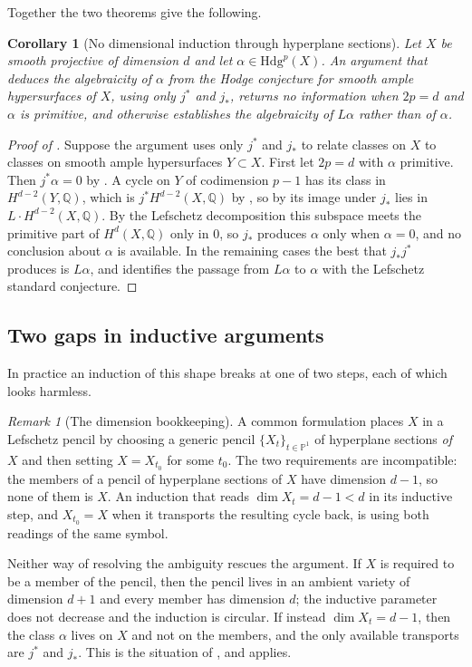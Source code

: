 \documentclass[11pt,reqno]{amsart}
\theoremstyle{plain}
\newtheorem{corollary}[theorem]{Corollary}
\theoremstyle{definition}
\theoremstyle{remark}
\newtheorem{remark}[theorem]{Remark}
\newcommand{\QQ}{\mathbb{Q}}
\newcommand{\PP}{\mathbb{P}}
\newcommand{\Hdg}{\mathrm{Hdg}}
\begin{document}
Together the two theorems give the following.

\begin{corollary}[No dimensional induction through hyperplane sections]%
\label{cor:noinduction}
Let $X$ be smooth projective of dimension $d$ and let $\alpha\in\Hdg^{p}(X)$.
An argument that deduces the algebraicity of $\alpha$ from the Hodge
conjecture for smooth ample hypersurfaces of $X$, using only $j^{*}$ and
$j_{*}$, returns no information when $2p=d$ and $\alpha$ is primitive, and
otherwise establishes the algebraicity of $L\alpha$ rather than of $\alpha$.
\end{corollary}

\begin{proof}[Proof of ]
Suppose the argument uses only $j^{*}$ and $j_{*}$ to relate classes on $X$ to
classes on smooth ample hypersurfaces $Y\subset X$. First let $2p=d$ with
$\alpha$ primitive. Then $j^{*}\alpha=0$ by . A cycle on
$Y$ of codimension $p-1$ has its class in $H^{d-2}(Y,\QQ)$, which is
$j^{*}H^{d-2}(X,\QQ)$ by , so by  its
image under $j_{*}$ lies in $L\cdot H^{d-2}(X,\QQ)$. By the Lefschetz
decomposition this subspace meets the primitive part of $H^{d}(X,\QQ)$ only
in $0$, so $j_{*}$ produces $\alpha$ only when $\alpha=0$, and no conclusion
about $\alpha$ is available. In the remaining cases the best that
$j_{*}j^{*}$ produces is $L\alpha$, and  identifies the
passage from $L\alpha$ to $\alpha$ with the Lefschetz standard conjecture.
\end{proof}

\subsection{Two gaps in inductive arguments}

In practice an induction of this shape breaks at one of two steps, each of
which looks harmless.

\begin{remark}[The dimension bookkeeping]\label{rem:dimensionbookkeeping}
A common formulation places $X$ in a Lefschetz pencil by choosing a generic
pencil $\{X_{t}\}_{t\in\PP^{1}}$ of hyperplane sections \emph{of $X$} and then
setting $X=X_{t_{0}}$ for some $t_{0}$. The two requirements are
incompatible: the members of a pencil of hyperplane sections of $X$ have
dimension $d-1$, so none of them is $X$. An induction that reads
$\dim X_{t}=d-1<d$ in its inductive step, and $X_{t_{0}}=X$ when it transports
the resulting cycle back, is using both readings of the same symbol.

Neither way of resolving the ambiguity rescues the argument. If $X$ is
required to be a member of the pencil, then the pencil lives in an ambient
variety of dimension $d+1$ and every member has dimension $d$; the inductive
parameter does not decrease and the induction is circular. If instead
$\dim X_{t}=d-1$, then the class $\alpha$ lives on $X$ and not on the members,
and the only available transports are $j^{*}$ and $j_{*}$. This is the
situation of , and 
applies.
\end{remark}
\end{document}
